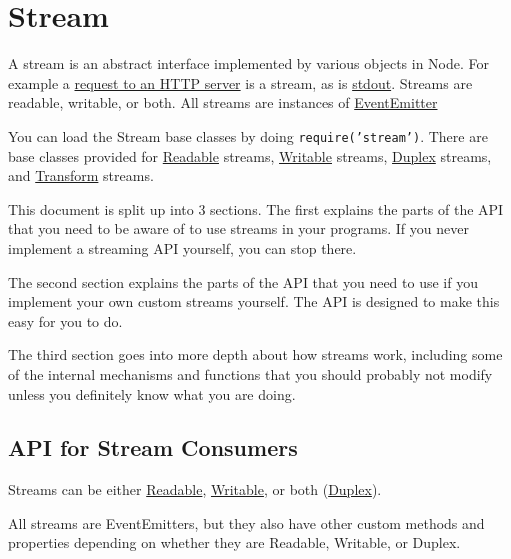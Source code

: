 \section{Stream}

\begin{Shaded}
\begin{Highlighting}[]
\NormalTok{: } 
\end{Highlighting}
\end{Shaded}

A stream is an abstract interface implemented by various objects in
Node. For example a
\href{http.html\#http\_http\_incomingmessage}{request to an HTTP server}
is a stream, as is
\href{process.html\#process\_process\_stdout}{stdout}. Streams are
readable, writable, or both. All streams are instances of
\href{events.html\#events\_class\_events\_eventemitter}{EventEmitter}

You can load the Stream base classes by doing
\texttt{require('stream')}. There are base classes provided for
\hyperref[stream\_class\_stream\_readable]{Readable} streams,
\hyperref[stream\_class\_stream\_writable]{Writable} streams,
\hyperref[stream\_class\_stream\_duplex]{Duplex} streams, and
\hyperref[stream\_class\_stream\_transform]{Transform} streams.

This document is split up into 3 sections. The first explains the parts
of the API that you need to be aware of to use streams in your programs.
If you never implement a streaming API yourself, you can stop there.

The second section explains the parts of the API that you need to use if
you implement your own custom streams yourself. The API is designed to
make this easy for you to do.

The third section goes into more depth about how streams work, including
some of the internal mechanisms and functions that you should probably
not modify unless you definitely know what you are doing.

\subsection{API for Stream Consumers}

Streams can be either
\hyperref[stream\_class\_stream\_readable]{Readable},
\hyperref[stream\_class\_stream\_writable]{Writable}, or both
(\hyperref[stream\_class\_stream\_duplex]{Duplex}).

All streams are EventEmitters, but they also have other custom methods
and properties depending on whether they are Readable, Writable, or
Duplex.

